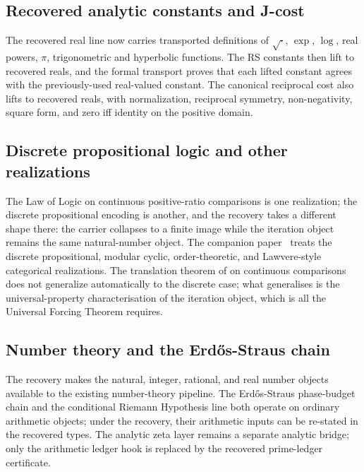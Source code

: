 \documentclass[11pt,a4paper]{article}
\theoremstyle{definition}
\theoremstyle{remark}
\begin{document}
\subsection{Recovered analytic constants and J-cost}

The recovered real line now carries transported definitions of
$\sqrt{\cdot}$, $\exp$, $\log$, real powers, $\pi$, trigonometric and
hyperbolic functions. The RS constants then lift to recovered reals,
and the formal transport proves that each lifted constant agrees with
the previously-used real-valued constant. The canonical reciprocal
cost also lifts to recovered reals, with normalization, reciprocal
symmetry, non-negativity, square form, and zero iff identity on the
positive domain.

\subsection{Discrete propositional logic and other realizations}

The Law of Logic on continuous positive-ratio comparisons is one
realization; the discrete propositional encoding is another, and the
recovery takes a different shape there: the carrier collapses to a
finite image while the iteration object remains the same
natural-number object. The companion paper~\cite{Washburn2026UniversalForcing}
treats the discrete propositional, modular cyclic, order-theoretic,
and Lawvere-style categorical realizations. The translation theorem
of \cite{Washburn2026LogicFE} on continuous comparisons does not
generalize automatically to the discrete case; what generalises is the
universal-property characterisation of the iteration object, which is
all the Universal Forcing Theorem requires.

\subsection{Number theory and the Erd\H{o}s-Straus chain}

The recovery makes the natural, integer, rational, and real number
objects available to the existing number-theory pipeline. The
Erd\H{o}s-Straus phase-budget chain and the conditional Riemann
Hypothesis line both operate on ordinary arithmetic objects; under
the recovery, their arithmetic inputs can be re-stated in the
recovered types. The analytic zeta layer remains a separate analytic
bridge; only the arithmetic ledger hook is replaced by the recovered
prime-ledger certificate.
\end{document}
